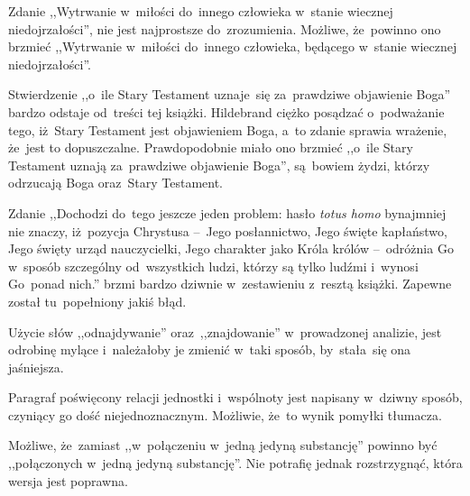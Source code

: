 \documentclass[a4paper,11pt]{article}
\begin{document}



\start {} Zdanie ,,Wytrwanie w~miłości do~innego człowieka
w~stanie wiecznej niedojrzałości'', nie jest najprostsze
do~zrozumienia. Możliwe, że~powinno ono brzmieć ,,Wytrwanie w~miłości
do~innego człowieka, będącego w~stanie wiecznej niedojrzałości''.

\vspace{\spaceFour}


\start {} Stwierdzenie ,,o~ile Stary Testament uznaje~się
za~prawdziwe objawienie Boga'' bardzo odstaje od~treści tej książki.
Hildebrand ciężko posądzać o~podważanie tego, iż~Stary Testament jest
objawieniem Boga, a~to zdanie sprawia wrażenie, że~jest to
dopuszczalne. Prawdopodobnie miało ono brzmieć ,,o~ile Stary Testament
uznają za~prawdziwe objawienie Boga'', są~bowiem żydzi, którzy
odrzucają Boga oraz~Stary Testament.

\vspace{\spaceFour}


\start {} Zdanie ,,Dochodzi do~tego jeszcze jeden problem:
hasło \emph{totus homo} bynajmniej nie znaczy, iż~pozycja Chrystusa
--~Jego posłannictwo, Jego święte kapłaństwo, Jego święty urząd
nauczycielki, Jego charakter jako Króla królów --~odróżnia Go w~sposób
szczególny od~wszystkich ludzi, którzy są tylko ludźmi i~wynosi
Go~ponad nich.'' brzmi bardzo dziwnie w~zestawieniu z~resztą książki.
Zapewne został tu~popełniony jakiś błąd.

\vspace{\spaceFour}


\start {} Użycie słów ,,odnajdywanie'' oraz~,,znajdowanie''
w~prowadzonej analizie, jest odrobinę mylące i~należałoby je zmienić
w~taki sposób, by~stała~się ona jaśniejsza.

\vspace{\spaceFour}


\start {} Paragraf poświęcony relacji jednostki i~wspólnoty
jest napisany w~dziwny sposób, czyniący go dość niejednoznacznym.
Możliwie, że~to wynik pomyłki tłumacza.

\vspace{\spaceFour}


\start {} Możliwe, że~zamiast ,,w~połączeniu w~jedną jedyną
substancję'' powinno być ,,połączonych w~jedną jedyną substancję''.
Nie potrafię jednak rozstrzygnąć, która wersja jest poprawna.
\end{document}
